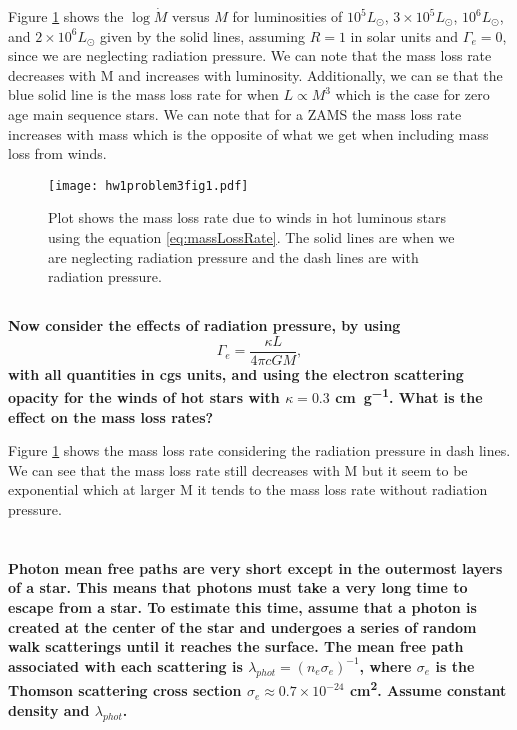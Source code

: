 Figure \ref{fig:problem3Fig} shows the $\log\Dot{M}$ versus $M$ for luminosities of $10^5 L_\odot$, $3\times 10^5 L_\odot$, $10^6 L_\odot$, and $2\times 10^6 L_\odot$ given by the solid lines, assuming $R =1 $ in solar units and $\Gamma_e = 0$, since we are neglecting radiation pressure. We can note that the mass loss rate decreases with M and increases with luminosity. Additionally, we can se that the blue solid line is the mass loss rate for when $L\propto M^3$ which is the case for zero age main sequence stars. We can note that for a ZAMS the mass loss rate increases with mass which is the opposite of what we get when including mass loss from winds.  

\begin{figure}
    \centering
    \texttt{[image: hw1problem3fig1.pdf]}
    \caption{Plot shows the mass loss rate due to winds in hot luminous stars using the equation \ref{eq:massLossRate}. The solid lines are when we are neglecting radiation pressure and the dash lines are with radiation pressure. }
    \label{fig:problem3Fig}
\end{figure}


\subsection{}
\textbf{Now consider the effects of radiation pressure, by using
\begin{equation}
    \Gamma_e = \frac{\kappa L}{4\pi c GM},
\end{equation}
with all quantities in cgs units, and using the electron scattering opacity for the winds of hot stars with $\kappa = 0.3$ \si{\centi\meter\per\g}.
What is the effect on the mass loss rates?}

Figure \ref{fig:problem3Fig} shows the mass loss rate considering the radiation pressure in dash lines. We can see that the mass loss rate still decreases with M but it seem to be exponential which at larger M it tends to the mass loss rate without radiation pressure.



\clearpage
\section{}
\textbf{Photon mean free paths are very short except in the outermost
layers of a star.
This means that photons must take a very long time to escape from a star.
To estimate this time, assume that a photon is created at the center of the star and undergoes a series of random walk scatterings until it reaches the surface.
The mean free path associated with each scattering is $\lambda_{phot} = (n_e\sigma_e)^{-1}$, where $\sigma_e$ is the Thomson scattering cross section $\sigma_e \approx 0.7 \times 10^{-24}$ \si{\square\centi\meter}. 
Assume constant density and $\lambda_{phot}$.}
